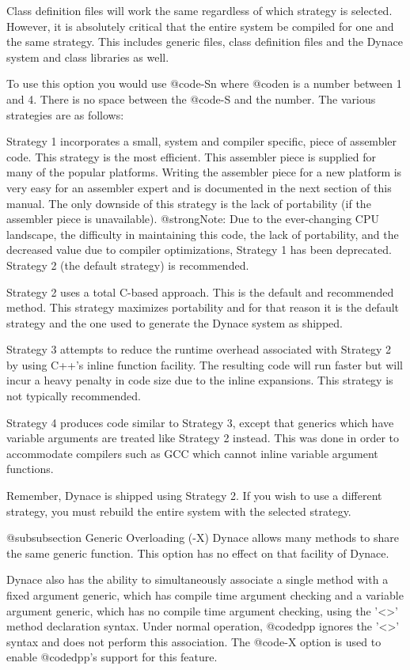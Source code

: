 Class definition files will work the same regardless of which strategy
is selected.  However, it is absolutely critical that the entire system
be compiled for one and the same strategy.  This includes generic files,
class definition files and the Dynace system and class libraries as well.

To use this option you would use @code{-Sn} where @code{n} is a number
between 1 and 4.  There is no space between the @code{-S} and the number.
The various strategies are as follows:

Strategy 1 incorporates a small, system and compiler specific, piece
of assembler code.  This strategy is the most efficient.  This
assembler piece is supplied for many of the popular platforms.
Writing the assembler piece for a new platform is very easy for an
assembler expert and is documented in the next section of this manual.
The only downside of this strategy is the lack of portability (if the
assembler piece is unavailable). @strong{Note:} Due to the ever-changing
CPU landscape, the difficulty in maintaining this code, the lack of portability,
and the decreased value due to compiler optimizations, Strategy 1 has
been deprecated.  Strategy 2 (the default strategy) is recommended.


Strategy 2 uses a total C-based approach.  This is the default and
recommended method.  This strategy maximizes portability and for that
reason it is the default strategy and the one used to generate the
Dynace system as shipped.  

Strategy 3 attempts to reduce the runtime overhead associated with
Strategy 2 by using C++'s inline function facility.  The resulting
code will run faster but will incur a heavy penalty in code size due
to the inline expansions.  This strategy is not typically recommended.

Strategy 4 produces code similar to Strategy 3, except that generics
which have variable arguments are treated like Strategy 2 instead.
This was done in order to accommodate compilers such as GCC which
cannot inline variable argument functions.

Remember, Dynace is shipped using Strategy 2.  If you wish to use a
different strategy, you must rebuild the entire system with the selected
strategy.

@subsubsection Generic Overloading (-X)
Dynace allows many methods to share the same generic function.  This
option has no effect on that facility of Dynace.

Dynace also has the ability to simultaneously associate a single method
with a fixed argument generic, which has compile time argument checking
and a variable argument generic, which has no compile time argument
checking, using the '<>' method declaration syntax.  Under normal
operation, @code{dpp} ignores the '<>' syntax and does not perform
this association.  The @code{-X} option is used to enable @code{dpp}'s
support for this feature.

